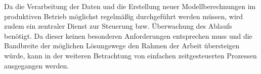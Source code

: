 Da die Verarbeitung der Daten und die Erstellung neuer Modellberechnungen im produktiven Betrieb möglichst regelmäßig durchgeführt werden müssen, wird zudem ein zentraler Dienst zur Steuerung bzw. Überwachung des Ablaufs benötigt. Da dieser keinen besonderen Anforderungen entsprechen muss und die Bandbreite der möglichen Lösungswege den Rahmen der Arbeit übersteigen würde, kann in der weiteren Betrachtung von einfachen zeitgesteuerten Prozessen ausgegangen werden. 
